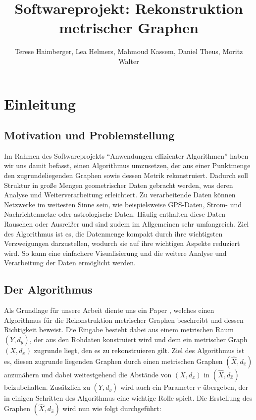 \documentclass[parskip=half,
 fontsize=12pt, bibtotoc,
 ngerman]
 {article}
\author{Terese Haimberger, Lea Helmers, Mahmoud Kassem, Daniel Theus, Moritz Walter}
\title{Softwareprojekt: Rekonstruktion metrischer Graphen}
\date{}
\begin{document}
\maketitle
\tableofcontents
\newpage
\onehalfspacing
\section{Einleitung}
\subsection{Motivation und Problemstellung}
Im Rahmen des Softwareprojekts "`Anwendungen effizienter Algorithmen"' haben wir uns damit befasst, einen Algorithmus umzusetzen, der aus einer Punktmenge den zugrundeliegenden Graphen sowie dessen Metrik rekonstruiert. Dadurch soll Struktur in gro{\ss}e Mengen geometrischer Daten gebracht werden, was deren Analyse und Weiterverarbeitung erleichtert. Zu verarbeitende Daten können Netzwerke im weitesten Sinne sein, wie beispielsweise GPS-Daten, Strom- und Nachrichtennetze oder astrologische Daten. Häufig enthalten diese Daten Rauschen oder Ausreißer und sind zudem im Allgemeinen sehr umfangreich. Ziel des Algorithmus ist es, die Datenmenge kompakt durch ihre wichtigsten Verzweigungen darzustellen, wodurch sie auf ihre wichtigen Aspekte reduziert wird. So kann eine einfachere Visualisierung und die weitere Analyse und Verarbeitung der Daten ermöglicht werden.
\subsection{Der Algorithmus}
Als Grundlage für unsere Arbeit diente uns ein Paper \cite{chenEa2012}, welches einen Algorithmus für die Rekonstruktion metrischer Graphen beschreibt und dessen Richtigkeit beweist. Die Eingabe besteht dabei aus einem metrischen Raum $\left(Y, d_y\right)$, der aus den Rohdaten konstruiert wird und dem ein metrischer Graph $\left(X, d_x\right)$ zugrunde liegt, den es zu rekonstruieren gilt. Ziel des Algorithmus ist es, diesen zugrunde liegenden Graphen durch einen metrischen Graphen $(\hat{X}, d_{\hat{x}})$ anzunähern und dabei weitestgehend die Abstände von $\left(X, d_x\right)$ in $(\hat{X}, d_{\hat{x}})$ beizubehalten. Zusätzlich zu $\left(Y, d_y\right)$ wird auch ein Parameter $r$ übergeben, der in einigen Schritten des Algorithmus eine wichtige Rolle spielt. Die Erstellung des Graphen $(\hat{X}, d_{\hat{x}})$ wird nun wie folgt durchgeführt:\newline
\end{document}
